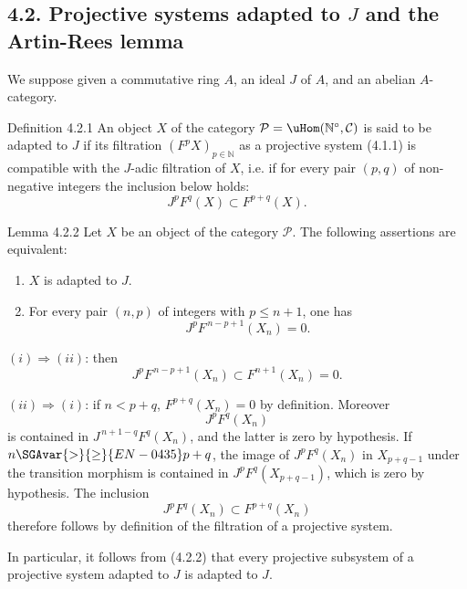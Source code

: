 \subsection*{4.2. Projective systems adapted to \(J\) and the Artin-Rees lemma}

We suppose given a commutative ring \(A\), an ideal \(J\) of \(A\), and an abelian \(A\)-category.

\begin{statement}{Definition 4.2.1}
An object \(X\) of the category \(\mathcal P=\uHom(\mathbb N^\circ,\mathcal C)\) is said to be adapted to \(J\) if its filtration \((F^pX)_{p\in\mathbb N}\) as a projective system (4.1.1) is compatible with the \(J\)-adic filtration of \(X\), i.e. if for every pair \((p,q)\) of non-negative integers the inclusion below holds:
\[
J^pF^q(X)\subset F^{p+q}(X).
\]
\end{statement}

\begin{statement}{Lemma 4.2.2}
Let \(X\) be an object of the category \(\mathcal P\). The following assertions are equivalent:
\begin{enumerate}[label=\textup{(\roman*)}]
\item \(X\) is adapted to \(J\).
\item For every pair \((n,p)\) of integers with \(p\le n+1\), one has
\[
J^pF^{\,n-p+1}(X_n)=0 .
\]
\end{enumerate}
\end{statement}

\begin{prooftext}
\((i)\Rightarrow(ii)\): then
\[
J^pF^{\,n-p+1}(X_n)\subset F^{n+1}(X_n)=0.
\]

\((ii)\Rightarrow(i)\): if \(n<p+q\), \(F^{p+q}(X_n)=0\) by definition. Moreover
\[
J^pF^q(X_n)
\]
is contained in \(J^{\,n+1-q}F^q(X_n)\), and the latter is zero by hypothesis. If \(n\SGAvar{>}{\ge}{EN-0435} p+q\), the image of \(J^pF^q(X_n)\) in \(X_{p+q-1}\) under the transition morphism is contained in \(J^pF^q(X_{p+q-1})\), which is zero by hypothesis. The inclusion
\[
J^pF^q(X_n)\subset F^{p+q}(X_n)
\]
therefore follows by definition of the filtration of a projective system.

In particular, it follows from (4.2.2) that every projective subsystem of a projective system adapted to \(J\) is adapted to \(J\).
\end{prooftext}

